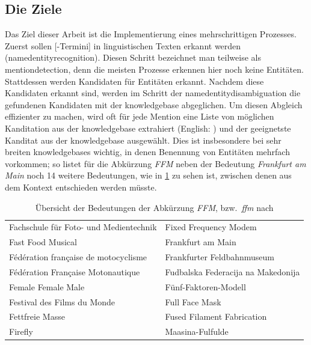 \subsection{Die Ziele}
\label{ssec:ziele}
Das Ziel dieser Arbeit ist die Implementierung eines mehrschrittigen Prozesses.
Zuerst sollen [-Termini] in linguistischen Texten erkannt werden (\gls{namedentityrecognition}).
Diesen Schritt bezeichnet man teilweise als \gls{mentiondetection},
denn die meisten Prozesse erkennen hier noch keine Entitäten.
Stattdessen werden Kandidaten für Entitäten erkannt.
Nachdem diese Kandidaten erkannt sind,
werden im Schritt der \gls{namedentitydisambiguation}
die gefundenen Kandidaten mit der \gls{knowledgebase} abgeglichen.
Um diesen Abgleich effizienter zu machen,
wird oft für jede Mention eine Liste von möglichen Kanditation aus der \gls{knowledgebase} extrahiert
(English: )\autocite{Raheim2022}
und der geeignetste Kanditat aus der \gls{knowledgebase} ausgewählt.
Dies ist insbesondere bei sehr breiten \glspl{knowledgebase} wichtig,
in denen Benennung von Entitäten mehrfach vorkommen;
so listet \citeauthor{dewiki:209960843}
für die Abkürzung \emph{FFM}\autocite{dewiki:209960843}
neben der Bedeutung \emph{Frankfurt am Main}\autocite{dewiki:225740004} noch 14 weitere Bedeutungen,
wie in \cref{tbl:ffm} zu sehen ist,
zwischen denen aus dem Kontext entschieden werden müsste.

\begin{table}
	\begin{tabularx}{\textwidth}{l l}
		Fachschule für Foto- und Medientechnik & Fixed Frequency Modem              \\
		Fast Food Musical                      & Frankfurt am Main                  \\
		Fédération française de motocyclisme   & Frankfurter Feldbahnmuseum         \\
		Fédération Française Motonautique      & Fudbalska Federacija na Makedonija \\
		Female Female Male                     & Fünf-Faktoren-Modell               \\
		Festival des Films du Monde            & Full Face Mask                     \\
		Fettfreie Masse                        & Fused Filament Fabrication         \\
		Firefly                                & Maasina-Fulfulde
	\end{tabularx}
	\caption{
		Übersicht der Bedeutungen der Abkürzung \emph{FFM}, bzw.\, \emph{ffm}
		nach  \autocite{dewiki:209960843}
	}
	\label{tbl:ffm}
\end{table}


